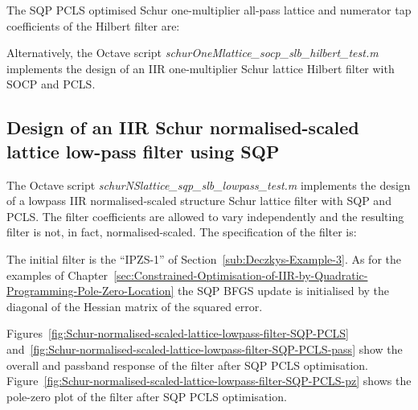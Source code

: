 \documentclass[a4paper,twoside,10pt,english]{report}
\begin{document}
The SQP PCLS optimised Schur one-multiplier all-pass lattice and numerator tap 
coefficients of the Hilbert filter are:
\begin{small}




\end{small}

Alternatively, the Octave script 
\emph{schurOneMlattice\_socp\_slb\_hilbert\_test.m} implements the design of an 
IIR one-multiplier Schur lattice Hilbert filter with SOCP and PCLS.
\clearpage
\subsection{Design of an IIR Schur normalised-scaled lattice low-pass filter using SQP}
The Octave script \emph{schurNSlattice\_sqp\_slb\_lowpass\_test.m} implements
the design of a lowpass IIR normalised-scaled structure Schur lattice filter
with SQP and PCLS. The filter coefficients are allowed to vary independently 
and the resulting filter is not, in fact, normalised-scaled. The specification
of the filter is:
\begin{small}

\end{small}
The initial filter is the ``IPZS-1'' of Section~\ref{sub:Deczkys-Example-3}. As
for the examples of 
Chapter~\ref{sec:Constrained-Optimisation-of-IIR-by-Quadratic-Programming-Pole-Zero-Location}
the SQP BFGS update is initialised by the diagonal of the Hessian matrix of the
squared error.

Figures~\ref{fig:Schur-normalised-scaled-lattice-lowpass-filter-SQP-PCLS} 
and~\ref{fig:Schur-normalised-scaled-lattice-lowpass-filter-SQP-PCLS-pass} 
show the overall and passband response of the filter after SQP PCLS optimisation.
Figure~\ref{fig:Schur-normalised-scaled-lattice-lowpass-filter-SQP-PCLS-pz} shows
the pole-zero plot of the filter after SQP PCLS optimisation.
\end{document}
